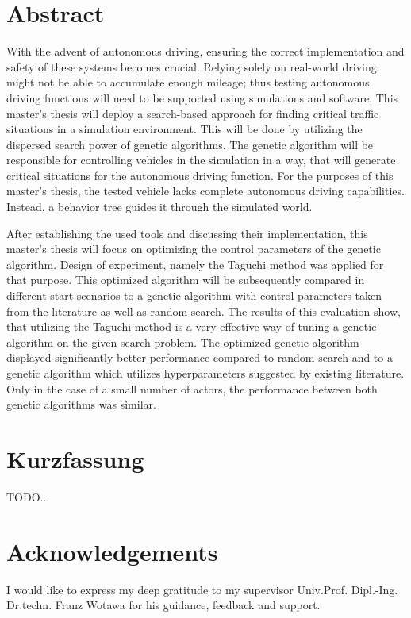 \chapter*{Abstract}
\label{chap:abstract}

With the advent of autonomous driving, ensuring the correct implementation and safety of these systems becomes crucial. Relying solely on real-world driving might not be able to accumulate enough mileage; thus testing autonomous driving functions will need to be supported using simulations and software. This master's thesis will deploy a search-based approach for finding critical traffic situations in a simulation environment. This will be done by utilizing the dispersed search power of genetic algorithms. The genetic algorithm will be responsible for controlling vehicles in the simulation in a way, that will generate critical situations for the autonomous driving function. For the purposes of this master's thesis, the tested vehicle lacks complete autonomous driving capabilities. Instead, a behavior tree guides it through the simulated world.

After establishing the used tools and discussing their implementation, this master's thesis will focus on optimizing the control parameters of the genetic algorithm. Design of experiment, namely the Taguchi method was applied for that purpose. This optimized algorithm will be subsequently compared in different start scenarios to a genetic algorithm with control parameters taken from the literature as well as random search. The results of this evaluation show, that utilizing the Taguchi method is a very effective way of tuning a genetic algorithm on the given search problem. The optimized genetic algorithm displayed significantly better performance compared to random search and to a genetic algorithm which utilizes hyperparameters suggested by existing literature. Only in the case of a small number of actors, the performance between both genetic algorithms was similar.


\chapter*{Kurzfassung}
\label{chap:kurzfassung}


TODO...


\chapter*{Acknowledgements}
\label{chap:acknowledgements}
I would like to express my deep gratitude to my supervisor Univ.Prof. Dipl.-Ing. Dr.techn. Franz Wotawa for his guidance, feedback and support.

